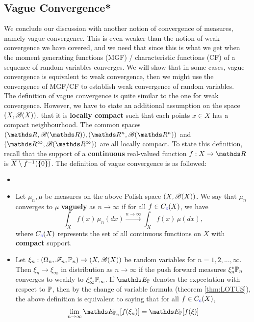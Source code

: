 \subsection{Vague Convergence*}
\begin{unexaminable}
We conclude our discussion with another notion of convergence of measures, namely vague convergence. This is even weaker than the notion of weak convergence we have covered, and we need that since this is what we get when the moment generating functions (MGF) / characteristic functions (CF) of a sequence of random variables converges. We will show that in some cases, vague convergence is equivalent to weak convergence, then we might use the convergence of MGF/CF to establish weak convergence of random variables.\\

The definition of vague convergence is quite similar to the one for weak convergence. However, we have to state an additional assumption on the space $(X,\mathcal{B}(X))$, that it is \textbf{locally compact} such that each points $x \in X$ has a compact neighbourhood. The common spaces $(\R,\B(\R)), (\R^n, \B(\R^n))$ and $(\R^\infty, \B(\R^\infty))$ are all locally compact. To state this definition, recall that the support of a \textbf{continuous} real-valued function $f:X \to \R$ is $\overline{X \setminus f^{-1}(\left\{ 0 \right \})}$. The definition of vague convergence is as followed:

\begin{definition} 
\begin{itemize}
\item[]
\item Let $\mu_n, \mu$ be measures on the above Polish space $(X,\mathcal{B}(X))$. We say that $\mu_n$ converges to $\mu$ \textbf{vaguely} as $n \to \infty$ if for all $f \in C_{\textcolor{blue}{c}}(X)$, we have
\begin{equation*}
    \int_X f(x) \, \mu_n(dx) \overset{n \to \infty}{\to} \int_X f(x) \, \mu(dx),
\end{equation*}
where $C_{\textcolor{blue}{c}}(X)$ represents the set of all continuous functions on $X$ with \textbf{compact} support.
\item Let $\xi_n : (\Omega_n, \mathcal{F}_n, \mathbb{P}_n) \to (X,\mathcal{B}(X))$ be random variables for $n = 1,2,...,\infty$. Then $\xi_n \to \xi_\infty$ in distribution as $n \to \infty$ if the push forward measures $\xi_n^* \mathbb{P}_n$ converges to weakly to $\xi_\infty^*\mathbb{P}_\infty$. If $\E_\p$ denotes the expectation with respect to $\mathbb{P}$, then by the change of variable formula (theorem \ref{thm:LOTUS}), the above definition is equivalent to saying that for all $f \in C_{\textcolor{blue}{c}}(X)$,
\begin{equation*}
    \lim_{n\to\infty} \E_{\p_n}[f(\xi_n)] = \E_{\p}[f(\xi)]
\end{equation*}
\end{itemize}
\end{definition}


\end{unexaminable}

